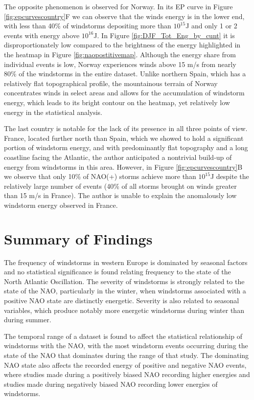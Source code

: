         The opposite phenomenon is observed for Norway. In its EP curve in Figure \ref{fig:epcurvescountry}F we can observe that the winds energy is in the lower end, with less than 40\% of windstorms depositing more than $10^{15}$J and only 1 or 2 events with energy above $10^{16}$J. In Figure \ref{fig:DJF_Tot_Eng_by_cunt} it is disproportionately low compared to the brightness of the energy highlighted in the heatmap in Figure \ref{fig:naopostitivemap}. Although the energy share from individual events is low, Norway experiences winds above 15 m/s from nearly 80\% of the windstorms in the entire dataset. Unlike northern Spain, which has a relatively flat topographical profile, the mountainous terrain of Norway concentrates winds in select areas and allows for the accumulation of windstorm energy, which leads to its bright contour on the heatmap, yet relatively low energy in the statistical analysis. 

        The last country is notable for the lack of its presence in all three points of view. France, located further north than Spain, which we showed to hold a significant portion of windstorm energy, and with predominantly flat topography and a long coastline facing the Atlantic, the author anticipated a nontrivial build-up of energy from windstorms in this area. However, in Figure \ref{fig:epcurvescountry}B we observe that only 10\% of NAO(+) storms achieve more than $10^{15}$J despite the relatively large number of events (40\% of all storms brought on winds greater than 15 m/s in France). The author is unable to explain the anomalously low windstorm energy observed in France.
        
        
        
\section{Summary of Findings}

     The frequency of windstorms in western Europe is dominated by seasonal factors and no statistical significance is found relating frequency to the state of the North Atlantic Oscillation. The severity of windstorms is strongly related to the state of the NAO, particularly in the winter, when windstorms associated with a positive NAO state are distinctly energetic. Severity is also related to seasonal variables, which produce notably more energetic windstorms during winter than during summer. 

     The temporal range of a dataset is found to affect the statistical relationship of windstorms with the NAO, with the most windstorm events occurring during the state of the NAO that dominates during the range of that study. The dominating NAO state also affects the recorded energy of positive and negative NAO events, where studies made during a positively biased NAO recording higher energies and studies made during negatively biased NAO recording lower energies of windstorms.

